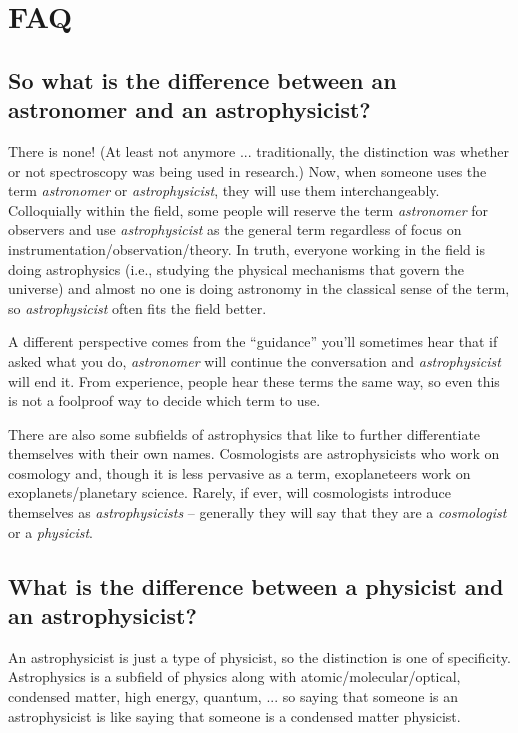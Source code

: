 \section{FAQ}

\vspace{-5pt}

\subsection{So what is the difference between an astronomer and an astrophysicist?}

There is none! (At least not anymore ... traditionally, the distinction was whether or not spectroscopy was being used in research.) Now, when someone uses the term \emph{astronomer} or \emph{astrophysicist}, they will use them interchangeably. Colloquially within the field, some people will reserve the term \emph{astronomer} for observers and use \emph{astrophysicist} as the general term regardless of focus on instrumentation/observation/theory. In truth, everyone working in the field is doing astrophysics (i.e., studying the physical mechanisms that govern the universe) and almost no one is doing astronomy in the classical sense of the term, so \emph{astrophysicist} often fits the field better.

A different perspective comes from the ``guidance'' you'll sometimes hear that if asked what you do, \textit{astronomer} will continue the conversation and \textit{astrophysicist} will end it. From experience, people hear these terms the same way, so even this is not a foolproof way to decide which term to use. 

There are also some subfields of astrophysics that like to further differentiate themselves with their own names. Cosmologists are astrophysicists who work on cosmology and, though it is less pervasive as a term, exoplaneteers work on exoplanets/planetary science. Rarely, if ever, will cosmologists introduce themselves as \emph{astrophysicists} -- generally they will say that they are a \emph{cosmologist} or a \emph{physicist}.

\subsection{What is the difference between a physicist and an astrophysicist?}

An astrophysicist is just a type of physicist, so the distinction is one of specificity. Astrophysics is a subfield of physics along with atomic/molecular/optical, condensed matter, high energy, quantum, ... so saying that someone is an astrophysicist is like saying that someone is a condensed matter physicist.

